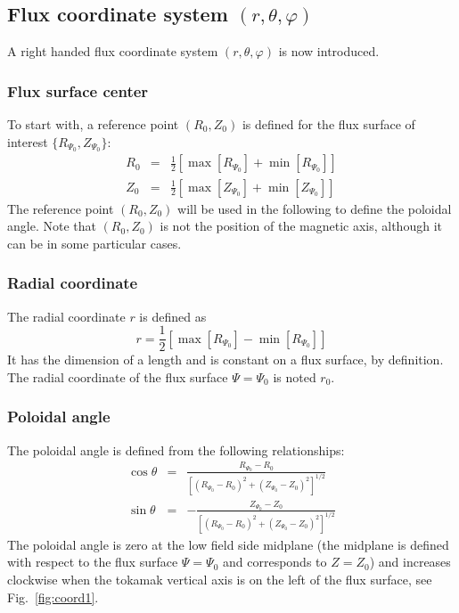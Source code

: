 \documentclass[a4paper]{report}
\begin{document}
\subsection{Flux coordinate system $(r,\theta,\varphi)$}
A right handed flux coordinate system $(r,\theta,\varphi)$ is now introduced.
\subsubsection{Flux surface center}
To start with, a reference point $(R_0,Z_0)$ is defined for the flux surface of interest $\{R_{\Psi_0},Z_{\Psi_0}\}$:
\begin{eqnarray}
 R_0 &=& \frac{1}{2}\left[\max[R_{\Psi_0}] + \min[R_{\Psi_0}]\right]\\
 Z_0 &=& \frac{1}{2}\left[\max[Z_{\Psi_0}] + \min[Z_{\Psi_0}]\right]
\end{eqnarray} 
The reference point  $(R_0,Z_0)$ will be used in the following to define the poloidal angle. Note that $(R_0,Z_0)$ is not the position of the magnetic axis, although it can be in some particular cases. 

\subsubsection{Radial coordinate}
The radial coordinate $r$ is defined as 
\begin{equation}
 r = \frac{1}{2}\left[\max[R_{\Psi_0}] - \min[R_{\Psi_0}]\right]
\end{equation}
It has the dimension of a length and is constant on a flux surface, by definition. The radial coordinate of the flux surface $\Psi=\Psi_0$ is noted $r_0$.

\subsubsection{Poloidal angle}
The poloidal angle is defined from the following relationships:
\begin{eqnarray}
 \cos \theta &=& \frac{R_{\Psi_0}-R_0}{\left[ (R_{\Psi_0}-R_0)^2 + (Z_{\Psi_0}-Z_0)^2 \right]^{1/2}}\\
 \sin \theta &=& -\frac{Z_{\Psi_0}-Z_0}{\left[ (R_{\Psi_0}-R_0)^2 + (Z_{\Psi_0}-Z_0)^2 \right]^{1/2}}
\end{eqnarray}
The poloidal angle is zero at the low field side midplane (the midplane is defined with respect to the flux surface $\Psi=\Psi_0$ and corresponds to $Z=Z_0$) and increases clockwise when the tokamak vertical axis is on the left of the flux surface, see Fig.~\ref{fig:coord1}.
\end{document}
